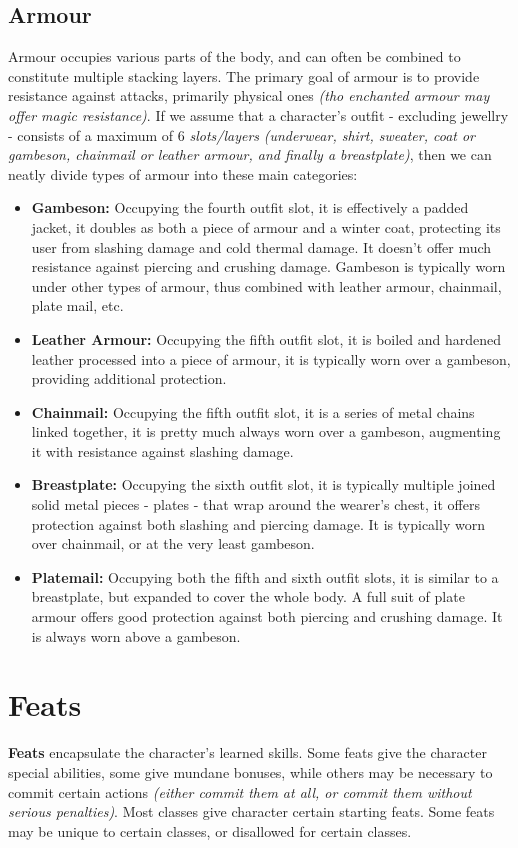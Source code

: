\documentclass[openany,11pt,a4paper]{book}
\begin{document}
\subsection{Armour}
Armour occupies various parts of the body, and can often be combined to constitute multiple stacking layers. The primary goal of armour is to provide resistance against attacks, primarily physical ones \textit{(tho enchanted armour may offer magic resistance)}. If we assume that a character's outfit - excluding jewellry - consists of a maximum of 6 \textit{slots/layers} \textit{(underwear, shirt, sweater, coat or gambeson, chainmail or leather armour, and finally a breastplate)}, then we can neatly divide types of armour into these main categories:
\begin{itemize}
\item \textbf{Gambeson:} Occupying the fourth outfit slot, it is effectively a padded jacket, it doubles as both a piece of armour and a winter coat, protecting its user from slashing damage and cold thermal damage. It doesn't offer much resistance against piercing and crushing damage. Gambeson is typically worn under other types of armour, thus combined with leather armour, chainmail, plate mail, etc.
\item \textbf{Leather Armour:} Occupying the fifth outfit slot, it is boiled and hardened leather processed into a piece of armour, it is typically worn over a gambeson, providing additional protection.
\item \textbf{Chainmail:} Occupying the fifth outfit slot, it is a series of metal chains linked together, it is pretty much always worn over a gambeson, augmenting it with resistance against slashing damage.
\item \textbf{Breastplate:} Occupying the sixth outfit slot, it is typically multiple joined solid metal pieces - plates - that wrap around the wearer's chest, it offers protection against both slashing and piercing damage. It is typically worn over chainmail, or at the very least gambeson.
\item \textbf{Platemail:} Occupying both the fifth and sixth outfit slots, it is similar to a breastplate, but expanded to cover the whole body. A full suit of plate armour offers good protection against both piercing and crushing damage. It is always worn above a gambeson.
\end{itemize}
\section{Feats}
\textbf{Feats} encapsulate the character's learned skills. Some feats give the character special abilities, some give mundane bonuses, while others may be necessary to commit certain actions \textit{(either commit them at all, or commit them without serious penalties)}. Most classes give character certain starting feats. Some feats may be unique to certain classes, or disallowed for certain classes.
\end{document}
